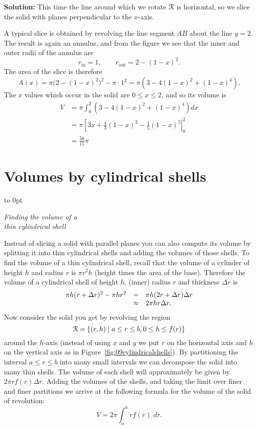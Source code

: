 \textbf{Solution: } This time the line around which we rotate $\mathcal{R}$ is
horizontal, so we slice the solid with planes perpendicular to the $x$-axis.

A typical slice is obtained by revolving the line segment $AB$ about the line
$y=2$.  The result is again an annulus, and from the figure we see that the
inner and outer radii of the annulus are
\[
r_{\textrm{in}} = 1,\qquad r_{\textrm{out}} = 2-(1-x)^2.
\]
The area of the slice is therefore
\[
A(x) = \pi \bigl(2-(1-x)^2\bigr)^2-\pi \cdot 1^2 = \pi\left( 3-4(1-x)^2+(1-x)^4
\right).
\]
The $x$ values which occur in the solid are $0\leq x\leq2$, and so its volume is
\begin{align*}
  V &= \pi\int_0^2\left( 3-4(1-x)^2+(1-x)^4 \right)dx\\
  &=\pi\left[ 3x+\tfrac43(1-x)^3-\tfrac15(1-x)^5 \right|_0^2\\
  &=\tfrac{56}{15}\pi
\end{align*}

\newpage%
\section{Volumes by cylindrical shells}
\vbox to 0pt{\centering%
  

  \footnotesize\sffamily\itshape Finding the volume of a\\
  thin cylindrical shell }  Instead of slicing a
solid with parallel planes you can also compute its volume by splitting it into
thin cylindrical shells and adding the volumes of those shells.  To find the
volume of a thin cylindrical shell, recall that the volume of a cylinder of
height $h$ and radius $r$ is $\pi r^2h$ (height times the area of the base).  Therefore the
volume of a cylindrical shell of height $h$, (inner) radius $r$ and thickness
$\Delta r$ is
\[\displayindent140pt \displaywidth220pt
\begin{array}{rcl}
  \pi h(r+\Delta r)^2 - \pi hr^2
  &=&\pi h (2r+\Delta r) \Delta r\\
  &\approx& 2\pi h r \Delta r.
\end{array}
\]
Now consider the solid you get by revolving the region
\[\displayindent140pt \displaywidth220pt
\setR = \left\{ (r, h) \mid a\leq r\leq b, 0\leq h\leq f(r) \right\}
\]
around the $h$-axis (instead of using $x$ and $y$ we put $r$ on the horizontal
axis and $h$ on the vertical axis as in Figure~\ref{fig:09cylindricalshells}).
By partitioning the interval $a\leq r \leq b$ into many small intervals we can
decompose the solid into many thin shells.  The volume of each shell will
approximately be given by $2\pi rf(r)\Delta r$.  Adding the volumes of the
shells, and taking the limit over finer and finer partitions we arrive at the
following formula for the volume of the solid of revolution:
\begin{equation}
  V = 2\pi\int_a^b rf(r) \;dr.
\end{equation}


